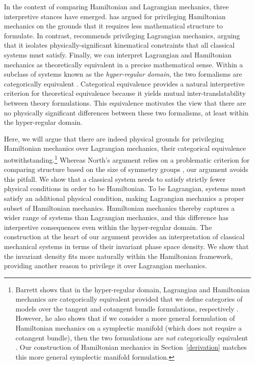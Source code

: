 \documentclass[12pt, english, twoside]{article} %
\begin{document}
In the context of comparing Hamiltonian and Lagrangian mechanics, three interpretive stances have emerged. \textcites[]{North} has argued for privileging Hamiltonian mechanics on the grounds that it requires less mathematical structure to formulate. In contrast, \textcites[]{Curiel} recommends privileging Lagrangian mechanics, arguing that it isolates physically-significant kinematical constraints that all classical systems must satisfy. Finally, we can interpret Lagrangian and Hamiltonian mechanics as theoretically equivalent in a precise mathematical sense. Within a subclass of systems known as the \textit{hyper-regular domain}, the two formalisms are categorically equivalent \parencites[]{Teh}{Barrett2}. Categorical equivalence provides a natural interpretive criterion for theoretical equivalence because it yields mutual inter-translatability between theory formulations. This equivalence motivates the view that there are no physically significant differences between these two formalisms, at least within the hyper-regular domain. 

Here, we will argue that there are indeed physical grounds for privileging Hamiltonian mechanics over Lagrangian mechanics, their categorical equivalence notwithstanding.\footnote{Barrett shows that in the hyper-regular domain, Lagrangian and Hamiltonian mechanics are categorically equivalent provided that we define categories of models over the tangent and cotangent bundle formulations, respectively \parencites*[1181-82]{Barrett2}. However, he also shows that if we consider a more general formulation of Hamiltonian mechanics on a symplectic manifold (which does not require a cotangent bundle), then the two formulations are \textit{not} categorically equivalent \parencites*[1182-83]{Barrett2}. Our construction of Hamiltonian mechanics in Section~\ref{derivation} matches this more general symplectic manifold formulation.} Whereas North's argument relies on a problematic criterion for comparing structure based on the size of symmetry groups \parencites[]{Swanson}, our argument avoids this pitfall. We show that a classical system needs to satisfy strictly fewer physical conditions in order to be Hamiltonian. To be Lagrangian, systems must satisfy an additional physical condition, making Lagrangian mechanics a proper subset of Hamiltonian mechanics. Hamiltonian mechanics thereby captures a wider range of systems than Lagrangian mechanics, and this difference has interpretive consequences even within the hyper-regular domain. The construction at the heart of our argument provides an interpretation of classical mechanical systems in terms of their invariant phase space density. We show that the invariant density fits more naturally within the Hamiltonian framework, providing another reason to privilege it over Lagrangian mechanics.
\end{document}
